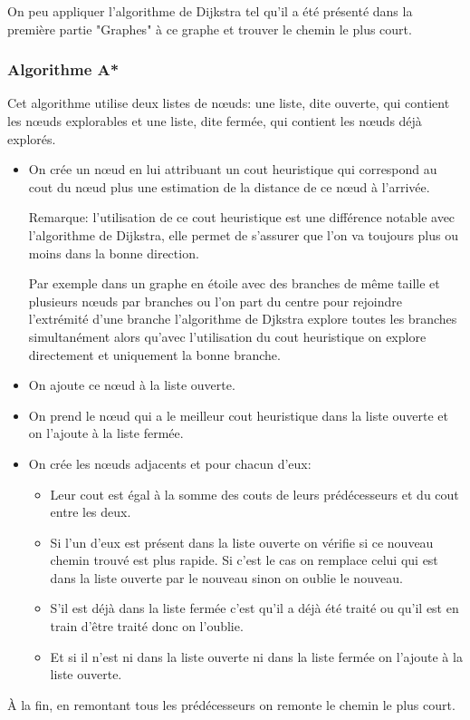     On peu appliquer l'algorithme de Dijkstra tel qu'il a été présenté dans la
    première partie "Graphes" à ce graphe et trouver le chemin le plus court.

  \subsubsection{Algorithme A*}
    Cet algorithme utilise deux listes de nœuds: une liste, dite ouverte, qui
    contient les nœuds explorables et une liste, dite fermée, qui contient les
    nœuds déjà explorés.

    \begin{itemize}
      \item On crée un nœud en lui attribuant un cout heuristique qui
        correspond au cout du nœud plus une estimation de la distance de ce
        nœud à l'arrivée.

        Remarque: l'utilisation de ce cout heuristique est une différence
        notable avec l'algorithme de Dijkstra, elle permet de s'assurer que
        l'on va toujours plus ou moins dans la bonne direction.

        Par exemple dans un graphe en étoile avec des branches de même taille
        et plusieurs nœuds par branches ou l'on part du centre pour rejoindre
        l'extrémité d'une branche l'algorithme de Djkstra explore toutes les
        branches simultanément alors qu'avec l'utilisation du cout heuristique
        on explore directement et uniquement la bonne branche.
      \item On ajoute ce nœud à la liste ouverte.
      \item On prend le nœud qui a le meilleur cout heuristique dans la liste
        ouverte et on l'ajoute à la liste fermée.
      \item On crée les nœuds adjacents et pour chacun d'eux:
        \begin{itemize}
          \item Leur cout est égal à la somme des couts de leurs prédécesseurs
            et du cout entre les deux.
          \item Si l'un d'eux est présent dans la liste ouverte on vérifie si
            ce nouveau chemin trouvé est plus rapide. Si c'est le cas on
            remplace celui qui est dans la liste ouverte par le nouveau sinon
            on oublie le nouveau.
          \item S'il est déjà dans la liste fermée c'est qu'il a déjà été
            traité ou qu'il est en train d'être traité donc on l'oublie.
          \item Et si il n'est ni dans la liste ouverte ni dans la liste fermée
            on l'ajoute à la liste ouverte.
        \end{itemize}
    \end{itemize}
	
    À la fin, en remontant tous les prédécesseurs on remonte le chemin le plus
    court.

